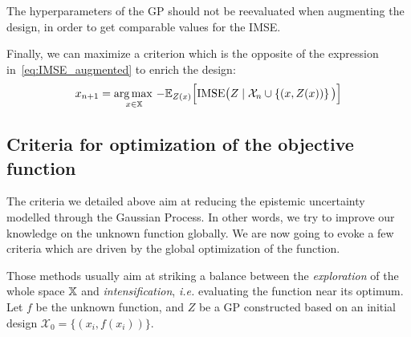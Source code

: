 \documentclass[../../Main_ManuscritThese.tex]{subfiles}
\newcommand\imgpath{/home/victor/acadwriting/Manuscrit/Text/Chapter4/img/}
\begin{document}
The hyperparameters of the GP should not be reevaluated when augmenting the design, in order to get comparable values for the IMSE.\@

Finally, we can maximize a criterion which is the opposite of the expression in~\cref{eq:IMSE_augmented} to enrich the design:
\begin{equation}
  x_{n+1} = \operatorname*{arg\,max \,}_{x\in \mathbb{X}}-\mathbb{E}_{Z(x)}\Big[\mathrm{IMSE} \big(Z \mid \mathcal{X}_n \cup \left\{(x, Z(x))\right\} \big)\Big]
\end{equation}

%   


\subsection{Criteria for optimization of the objective function}
\label{sec:GP_optimization_criteria}
The criteria we detailed above aim at reducing the epistemic
uncertainty modelled through the Gaussian Process. In other words, we
try to improve our knowledge on the unknown function globally. We are
now going to evoke a few criteria which are driven by the global
optimization of the function.

Those methods usually aim at striking a balance between the
\emph{exploration} of the whole space $\mathbb{X}$ and
\emph{intensification}, \textit{i.e.} evaluating the function near its
optimum.  Let $f$ be the unknown function, and $Z$ be a GP constructed
based on an initial design $\mathcal{X}_0 = \{(x_i, f(x_i))\}$.
\end{document}
